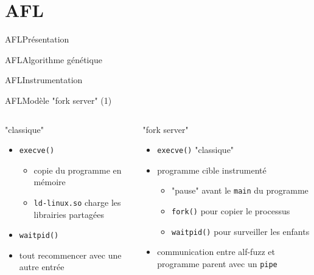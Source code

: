 \section{AFL}

\begin{frame}{AFL}{Présentation}
\end{frame}

\begin{frame}{AFL}{Algorithme génétique}
\end{frame}

\begin{frame}{AFL}{Instrumentation}
\end{frame}

\begin{frame}{AFL}{Modèle "fork server" (1)}
  \begin{columns}[t]
    \begin{column}{0.49\textwidth}
      \begin{block}{"classique"}
        \begin{itemize}
        \item \lstinline{execve()}
          \begin{itemize}
          \item copie du programme en mémoire
          \item \lstinline{ld-linux.so} charge les librairies partagées
          \end{itemize}
        \item \lstinline{waitpid()}
        \item tout recommencer avec une autre entrée
        \end{itemize}
        \vspace{3.5ex}
      \end{block}
    \end{column}

    \begin{column}{0.49\textwidth}
      \begin{block}{"fork server"}
        \begin{itemize}
        \item \lstinline{execve()} "classique"
        \item programme cible instrumenté
          \begin{itemize}
          \item "pause" avant le \lstinline{main} du programme
          \item \lstinline{fork()} pour copier le processus
          \item \lstinline{waitpid()} pour surveiller les enfants
          \end{itemize}
        \item communication entre alf-fuzz et programme parent avec un \lstinline{pipe}
        \end{itemize}
      \end{block}
    \end{column}
  \end{columns}
\end{frame}

